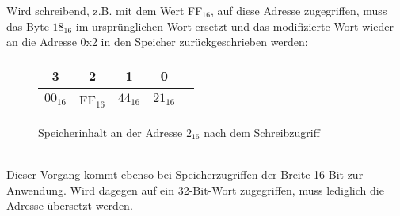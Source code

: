 Wird schreibend, z.B. mit dem Wert FF$_{16}$,  auf diese Adresse zugegriffen, muss das Byte $18_{16}$ im ursprünglichen Wort ersetzt und das modifizierte Wort wieder an die Adresse 0x2 in den Speicher zurückgeschrieben werden:
\begin{figure} [htpb]
    \centering
        \begin{tabular}{|c|c|c|c|c|}
            \multicolumn{1}{c}{3} & \multicolumn{1}{c}{2} &  \multicolumn{1}{c}{1}& \multicolumn{1}{c}{0}\\
            \hline
            $00_{16}$ & FF$_{16}$ & $44_{16}$ & $21_{16}$\\
            \hline
        \end{tabular}
        \caption{Speicherinhalt an der Adresse $2_{16}$ nach dem Schreibzugriff}
\end{figure}\\
Dieser Vorgang kommt ebenso bei Speicherzugriffen der Breite 16 Bit zur Anwendung.
Wird dagegen auf ein 32-Bit-Wort zugegriffen, muss lediglich die Adresse übersetzt werden.



